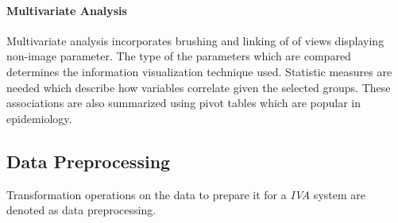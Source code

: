 \documentclass[journal]{style/vgtc} 			          %
\begin{document}
\paragraph{Multivariate Analysis}
Multivariate analysis incorporates brushing and linking of of views displaying non-image parameter.
%
The type of the parameters which are compared determines the information visualization technique used.
%
%
Statistic measures are needed which describe how variables correlate given the selected groups.
%
These associations are also summarized using pivot tables which are popular in epidemiology.



\subsection{Data Preprocessing} \label{Data Preprocessing}
Transformation operations on the data to prepare it for a \emph{IVA} system are denoted as data preprocessing.
\end{document}
